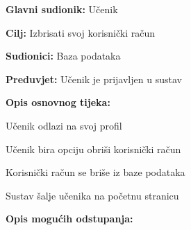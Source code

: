 					\noindent {}
					\begin{packed_item}
	
						\item \textbf{Glavni sudionik: }Učenik
						\item  \textbf{Cilj:} Izbrisati svoj korisnički račun
						\item  \textbf{Sudionici:} Baza podataka
						\item  \textbf{Preduvjet:} Učenik je prijavljen u sustav
						\item  \textbf{Opis osnovnog tijeka:}
						
						\item[] \begin{packed_enum}
	
							\item Učenik odlazi na svoj profil
							\item Učenik bira opciju obriši korisnički račun
							\item Korisnički račun se briše iz baze podataka
							\item Sustav šalje učenika na početnu stranicu
						\end{packed_enum}
						
						\item  \textbf{Opis mogućih odstupanja:}
						
	
								
								
							
					\end{packed_item}

